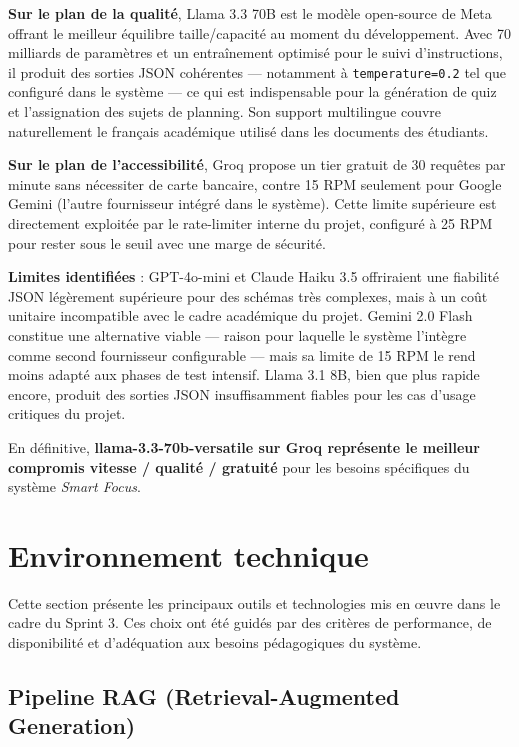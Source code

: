 \textbf{Sur le plan de la qualité}, Llama 3.3 70B est le modèle open-source
de Meta offrant le meilleur équilibre taille/capacité au moment du développement.
Avec 70 milliards de paramètres et un entraînement optimisé pour le suivi
d'instructions, il produit des sorties JSON cohérentes — notamment à
\texttt{temperature=0.2} tel que configuré dans le système — ce qui est
indispensable pour la génération de quiz et l'assignation des sujets de planning.
Son support multilingue couvre naturellement le français académique utilisé dans
les documents des étudiants.

\textbf{Sur le plan de l'accessibilité}, Groq propose un tier gratuit de 30
requêtes par minute sans nécessiter de carte bancaire, contre 15 RPM seulement
pour Google Gemini (l'autre fournisseur intégré dans le système). Cette limite
supérieure est directement exploitée par le rate-limiter interne du projet,
configuré à 25 RPM pour rester sous le seuil avec une marge de sécurité.

\textbf{Limites identifiées} : GPT-4o-mini et Claude Haiku 3.5 offriraient une
fiabilité JSON légèrement supérieure pour des schémas très complexes, mais à un
coût unitaire incompatible avec le cadre académique du projet. Gemini 2.0 Flash
constitue une alternative viable — raison pour laquelle le système l'intègre
comme second fournisseur configurable — mais sa limite de 15 RPM le rend moins
adapté aux phases de test intensif. Llama 3.1 8B, bien que plus rapide encore,
produit des sorties JSON insuffisamment fiables pour les cas d'usage critiques
du projet.

En définitive, \textbf{llama-3.3-70b-versatile sur Groq représente le meilleur
compromis vitesse / qualité / gratuité} pour les besoins spécifiques du système
\textit{Smart Focus}.

\section{Environnement technique}

Cette section présente les principaux outils et technologies mis en œuvre dans le cadre du Sprint 3. Ces choix ont été guidés par des critères de performance, de disponibilité et d'adéquation aux besoins pédagogiques du système.

\subsection{Pipeline RAG (Retrieval-Augmented Generation)}

